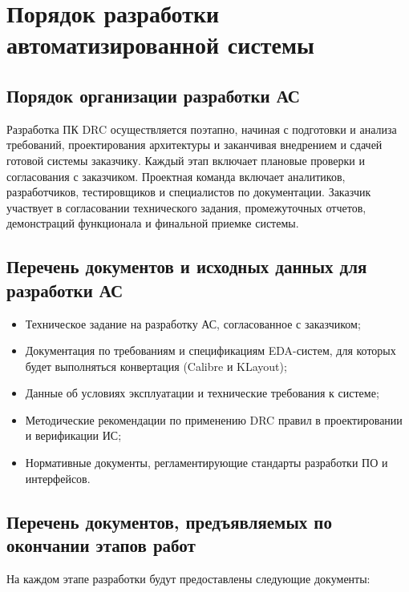 \section{Порядок разработки автоматизированной системы}

\subsection{Порядок организации разработки АС}

Разработка ПК DRC осуществляется поэтапно,
начиная с подготовки и анализа требований,
проектирования архитектуры и заканчивая внедрением
и сдачей готовой системы заказчику.
Каждый этап включает плановые проверки и согласования с заказчиком.
Проектная команда включает аналитиков, разработчиков,
тестировщиков и специалистов по документации.
Заказчик участвует в согласовании технического задания,
промежуточных отчетов, демонстраций функционала и финальной приемке системы.

\subsection{Перечень документов и исходных данных для разработки АС}

\begin{itemize}
	\item Техническое задание на разработку АС, согласованное с заказчиком;
	\item Документация по требованиям и спецификациям EDA-систем,
		для которых будет выполняться конвертация (Calibre и KLayout);
	\item Данные об условиях эксплуатации и технические требования к системе;
	\item Методические рекомендации по применению DRC правил
		в проектировании и верификации ИС;
	\item Нормативные документы,
		регламентирующие стандарты разработки ПО и интерфейсов.
\end{itemize}

\subsection{Перечень документов, предъявляемых по окончании этапов работ}

На каждом этапе разработки будут предоставлены следующие документы:

